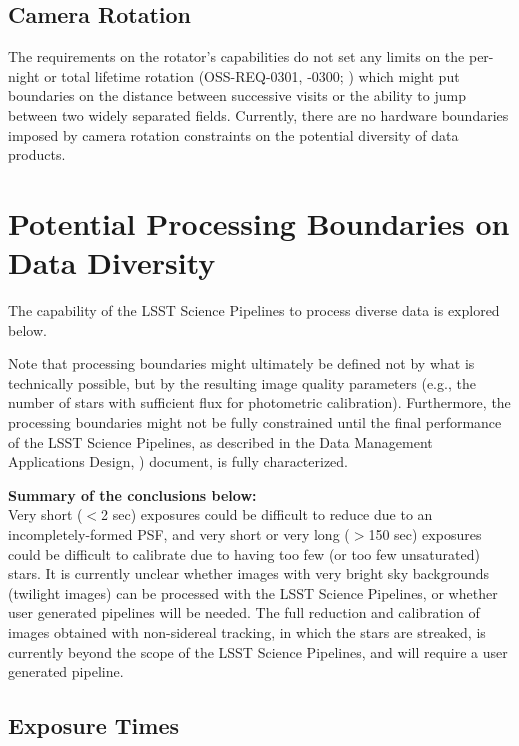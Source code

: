\documentclass[DM,lsstdoc,toc]{lsstdoc}
\begin{document}
\subsection{Camera Rotation}
The requirements on the rotator's capabilities do not set any limits on the per-night or total lifetime rotation (OSS-REQ-0301, -0300; ) which might put boundaries on the distance between successive visits or the ability to jump between two widely separated fields.
Currently, there are no hardware boundaries imposed by camera rotation constraints on the potential diversity of data products.



\section{Potential Processing Boundaries on Data Diversity}\label{sec:procbounds}

The capability of the LSST Science Pipelines to process diverse data is explored below.

Note that processing boundaries might ultimately be defined not by what is technically possible, but by the resulting image quality parameters (e.g., the number of stars with sufficient flux for photometric calibration).
Furthermore, the processing boundaries might not be fully constrained until the final performance of the LSST Science Pipelines, as described in the Data Management Applications Design, ) document, is fully characterized.

{\bf Summary of the conclusions below:}\\
Very short ($<$2 sec) exposures could be difficult to reduce due to an incompletely-formed PSF, and very short or very long ($>$150 sec) exposures could be difficult to calibrate due to having too few (or too few unsaturated) stars.
It is currently unclear whether images with very bright sky backgrounds (twilight images) can be processed with the LSST Science Pipelines, or whether user generated pipelines will be needed.
The full reduction and calibration of images obtained with non-sidereal tracking, in which the stars are streaked, is currently beyond the scope of the LSST Science Pipelines, and will require a user generated pipeline.



\subsection{Exposure Times}\label{ssec:procbounds_expt}
\end{document}
